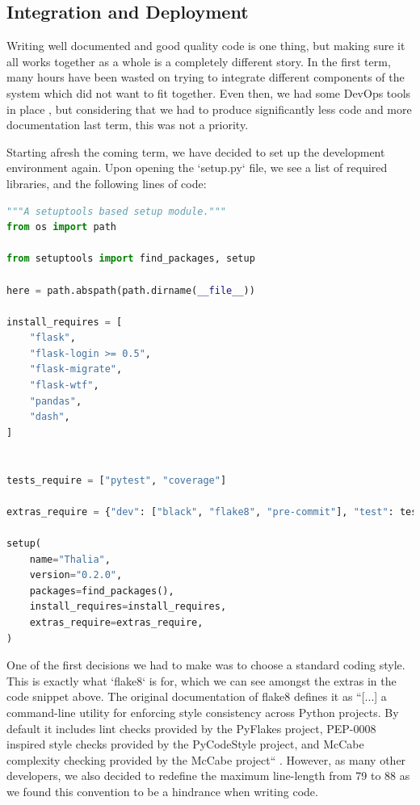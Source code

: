 \documentclass[main.tex]{subfiles}
\begin{document}
\subsection{Integration and Deployment}
\label{Coding Standards}

 Writing well documented and good quality code is one thing, but making sure it all works together as a whole is a completely different story. In the first term, many hours have been wasted on trying to integrate different components of the system which did not want to fit together. Even then, we had some DevOps tools in place \cite{DevOps}, but considering that we had to produce significantly less code and more documentation last term, this was not a priority.

 Starting afresh the coming term, we have decided to set up the development environment again. Upon opening the `setup.py` file, we see a list of required libraries, and the following lines of code:

\begin{lstlisting}[language=Python, caption=setup.py - Development environment, label=lst:Development_env]
"""A setuptools based setup module."""
from os import path

from setuptools import find_packages, setup

here = path.abspath(path.dirname(__file__))

install_requires = [
    "flask",
    "flask-login >= 0.5",
    "flask-migrate",
    "flask-wtf",
    "pandas",
    "dash",
]


tests_require = ["pytest", "coverage"]

extras_require = {"dev": ["black", "flake8", "pre-commit"], "test": tests_require}

setup(
    name="Thalia",
    version="0.2.0",
    packages=find_packages(),
    install_requires=install_requires,
    extras_require=extras_require,
)
\end{lstlisting}

One of the first decisions we had to make was to choose a standard coding style. This is exactly what `flake8` is for, which we can see amongst the extras in the code snippet above. The original documentation of flake8 defines it as ``[...] a command-line utility for enforcing style consistency across Python projects. By default it includes lint checks provided by the PyFlakes project, PEP-0008 inspired style checks provided by the PyCodeStyle project, and McCabe complexity checking provided by the McCabe project`` \cite{flake8}. However, as many other developers, we also decided to redefine the maximum line-length from 79 to 88 as we found this convention to be a hindrance when writing code.
\end{document}
